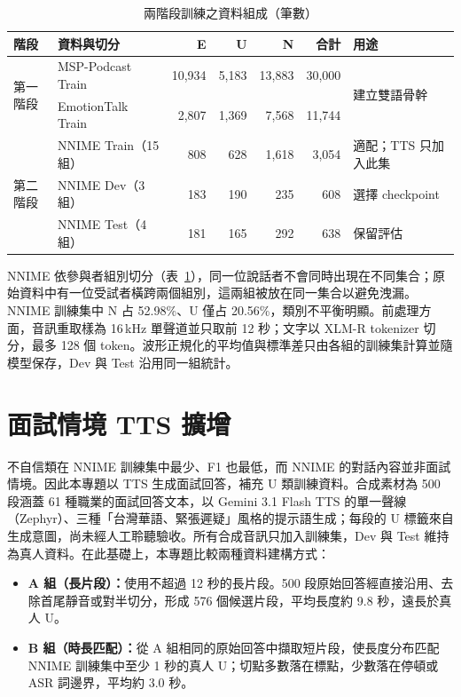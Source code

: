 \begin{table}[!htb]
\centering
\caption{兩階段訓練之資料組成（筆數）}
\label{tab:data}
\small
\begin{tabular}{@{}llrrrrl@{}}
\toprule
階段 & 資料與切分 & E & U & N & 合計 & 用途\\
\midrule
\multirow{2}{*}{第一階段} & MSP-Podcast Train & 10,934 & 5,183 & 13,883 & 30,000 & \multirow{2}{*}{建立雙語骨幹}\\
 & EmotionTalk Train & 2,807 & 1,369 & 7,568 & 11,744 & \\
\midrule
\multirow{3}{*}{第二階段} & NNIME Train（15 組） & 808 & 628 & 1,618 & 3,054 & 適配；TTS 只加入此集\\
 & NNIME Dev（3 組） & 183 & 190 & 235 & 608 & 選擇 checkpoint\\
 & NNIME Test（4 組） & 181 & 165 & 292 & 638 & 保留評估\\
\bottomrule
\end{tabular}
\end{table}

NNIME 依參與者組別切分（表~\ref{tab:data}），同一位說話者不會同時出現在不同集合；原始資料中有一位受試者橫跨兩個組別，這兩組被放在同一集合以避免洩漏。NNIME 訓練集中 N 占 52.98\%、U 僅占 20.56\%，類別不平衡明顯。前處理方面，音訊重取樣為 16\,kHz 單聲道並只取前 12 秒；文字以 XLM-R tokenizer 切分，最多 128 個 token。波形正規化的平均值與標準差只由各組的訓練集計算並隨模型保存，Dev 與 Test 沿用同一組統計。

\section{面試情境 TTS 擴增}
\label{sec:tts}

不自信類在 NNIME 訓練集中最少、F1 也最低，而 NNIME 的對話內容並非面試情境。因此本專題以 TTS 生成面試回答，補充 U 類訓練資料。合成素材為 500 段涵蓋 61 種職業的面試回答文本，以 Gemini 3.1 Flash TTS 的單一聲線（Zephyr）、三種「台灣華語、緊張遲疑」風格的提示語生成；每段的 U 標籤來自生成意圖，尚未經人工聆聽驗收。所有合成音訊只加入訓練集，Dev 與 Test 維持為真人資料。在此基礎上，本專題比較兩種資料建構方式：

\begin{itemize}
  \item \textbf{A 組（長片段）：}使用不超過 12 秒的長片段。500 段原始回答經直接沿用、去除首尾靜音或對半切分，形成 576 個候選片段，平均長度約 9.8 秒，遠長於真人 U。
  \item \textbf{B 組（時長匹配）：}從 A 組相同的原始回答中擷取短片段，使長度分布匹配 NNIME 訓練集中至少 1 秒的真人 U；切點多數落在標點，少數落在停頓或 ASR 詞邊界，平均約 3.0 秒。
\end{itemize}

